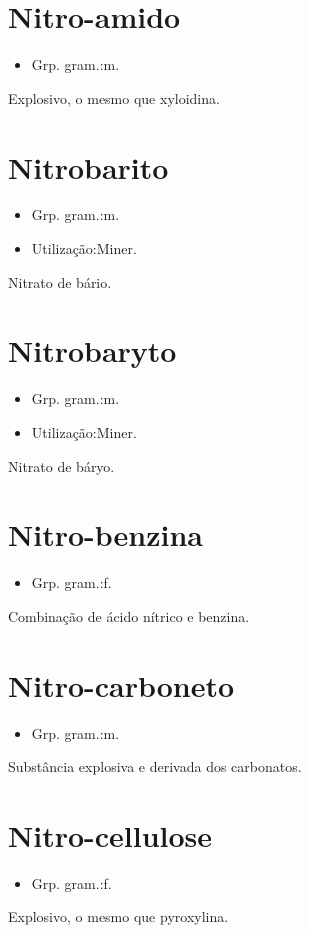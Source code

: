 \section{Nitro-amido}
\begin{itemize}
\item {Grp. gram.:m.}
\end{itemize}
Explosivo, o mesmo que \textunderscore xyloidina\textunderscore .
\section{Nitrobarito}
\begin{itemize}
\item {Grp. gram.:m.}
\end{itemize}
\begin{itemize}
\item {Utilização:Miner.}
\end{itemize}
Nitrato de bário.
\section{Nitrobaryto}
\begin{itemize}
\item {Grp. gram.:m.}
\end{itemize}
\begin{itemize}
\item {Utilização:Miner.}
\end{itemize}
Nitrato de báryo.
\section{Nitro-benzina}
\begin{itemize}
\item {Grp. gram.:f.}
\end{itemize}
Combinação de ácido nítrico e benzina.
\section{Nitro-carboneto}
\begin{itemize}
\item {Grp. gram.:m.}
\end{itemize}
Substância explosiva e derivada dos carbonatos.
\section{Nitro-cellulose}
\begin{itemize}
\item {Grp. gram.:f.}
\end{itemize}
Explosivo, o mesmo que \textunderscore pyroxylina\textunderscore .
